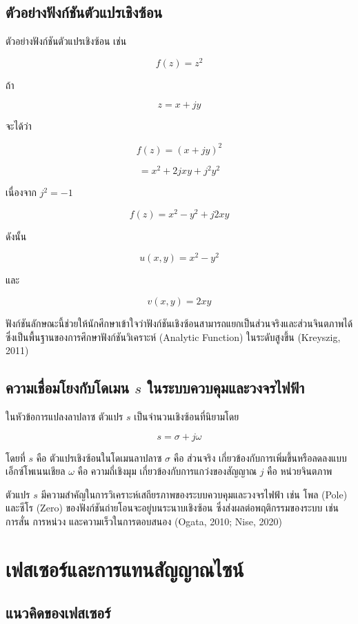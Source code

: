 \subsection{ตัวอย่างฟังก์ชันตัวแปรเชิงซ้อน}

ตัวอย่างฟังก์ชันตัวแปรเชิงซ้อน เช่น

\[
f(z)=z^2
\]

ถ้า

\[
z=x+jy
\]

จะได้ว่า

\[
f(z)=(x+jy)^2
\]

\[
=x^2+2jxy+j^2y^2
\]

เนื่องจาก $j^2=-1$

\[
f(z)=x^2-y^2+j2xy
\]

ดังนั้น

\[
u(x,y)=x^2-y^2
\]

และ

\[
v(x,y)=2xy
\]

ฟังก์ชันลักษณะนี้ช่วยให้นักศึกษาเข้าใจว่าฟังก์ชันเชิงซ้อนสามารถแยกเป็นส่วนจริงและส่วนจินตภาพได้ ซึ่งเป็นพื้นฐานของการศึกษาฟังก์ชันวิเคราะห์ (Analytic Function) ในระดับสูงขึ้น (Kreyszig, 2011)

\subsection{ความเชื่อมโยงกับโดเมน \texorpdfstring{$s$}{s} ในระบบควบคุมและวงจรไฟฟ้า}

ในหัวข้อการแปลงลาปลาซ ตัวแปร $s$ เป็นจำนวนเชิงซ้อนที่นิยามโดย

\[
s=\sigma+j\omega
\]

โดยที่  
$s$ คือ ตัวแปรเชิงซ้อนในโดเมนลาปลาซ  
$\sigma$ คือ ส่วนจริง เกี่ยวข้องกับการเพิ่มขึ้นหรือลดลงแบบเอ็กซ์โพเนนเชียล  
$\omega$ คือ ความถี่เชิงมุม เกี่ยวข้องกับการแกว่งของสัญญาณ  
$j$ คือ หน่วยจินตภาพ

ตัวแปร $s$ มีความสำคัญในการวิเคราะห์เสถียรภาพของระบบควบคุมและวงจรไฟฟ้า เช่น โพล (Pole) และซีโร (Zero) ของฟังก์ชันถ่ายโอนจะอยู่บนระนาบเชิงซ้อน ซึ่งส่งผลต่อพฤติกรรมของระบบ เช่น การสั่น การหน่วง และความเร็วในการตอบสนอง (Ogata, 2010; Nise, 2020)

\section{เฟสเซอร์และการแทนสัญญาณไซน์}

\subsection{แนวคิดของเฟสเซอร์}

